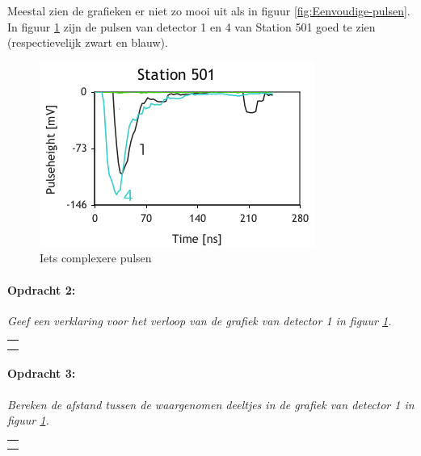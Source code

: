 \bigskip{}


Meestal zien de grafieken er niet zo mooi uit als in figuur \ref{fig:Eenvoudige-pulsen}.
In figuur \ref{fig:Iets-complexere-pulsen} zijn de pulsen van detector
1 en 4 van Station 501 goed te zien (respectievelijk zwart en blauw).

\begin{figure}[h]
\noindent \begin{centering}
\includegraphics[scale=0.65]{Figures/Traces501}
\par\end{centering}

\caption{\label{fig:Iets-complexere-pulsen}Iets complexere pulsen}
\end{figure}


\begin{minipage}[t]{1\columnwidth}%

\paragraph{Opdracht 2:}

\textit{Geef een verklaring voor het verloop van de grafiek van detector
1 in figuur \ref{fig:Iets-complexere-pulsen}.}

\begin{tabular}{>{\raggedright}p{16.6cm}}
\tabularnewline
\hline 
\tabularnewline
\hline 
\tabularnewline
\hline 
\tabularnewline
\hline 
\end{tabular}%
\end{minipage}

\bigskip{}


\begin{minipage}[t]{1\columnwidth}%

\paragraph{Opdracht 3:}

\textit{Bereken de afstand tussen de waargenomen deeltjes in de grafiek
van detector 1 in figuur \ref{fig:Iets-complexere-pulsen}.}

\begin{tabular}{>{\raggedright}p{16.6cm}}
\tabularnewline
\hline 
\tabularnewline
\hline 
\tabularnewline
\hline 
\tabularnewline
\hline 
\end{tabular}%
\end{minipage}


